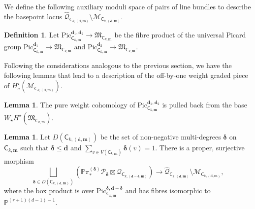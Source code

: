 \documentclass[12pt,reqno]{amsart}
\theoremstyle{definition}
\theoremstyle{definition}
\theoremstyle{definition}
\theoremstyle{definition}
\newtheorem{lemma}[theorem]{Lemma}
\newtheorem{definition}[theorem]{Definition}
\begin{document}
We define the following auxiliary moduli space of pairs of line bundles to describe the basepoint locus $\hat{\mathcal{Q}}_{\mathsf{C}_{k, (\mathbf{d}, \mathbf{m})}}\setminus \mathcal{M}_{\mathsf{C}_{k, (\mathbf{d}, \mathbf{m})}}.$

\begin{definition}
  Let $\mathrm{Pic}^{\mathbf{d}_1, \mathbf{d}_2}_{\mathsf{C}_{k, \mathbf{m}}}\to \mathfrak{M}_{\mathsf{C}_{k, \mathbf{m}}}$ be the fibre product of the universal Picard group $\mathrm{Pic}^{\mathbf{d}_1}_{\mathsf{C}_{k, \mathbf{m}}}\to \mathfrak{M}_{\mathsf{C}_{k, \mathbf{m}}}$ and $\mathrm{Pic}^{\mathbf{d}_2}_{\mathsf{C}_{k, \mathbf{m}}}\to \mathfrak{M}_{\mathsf{C}_{k, \mathbf{m}}}$.
\end{definition}

Following the considerations analogous to the previous section, we have the following lemmas that lead to a description of the off-by-one weight graded piece of $H_c^\star(\mathcal{M}_{\mathsf{C}_{k, (\mathbf{d}, \mathbf{m})}}).$

\begin{lemma}
  The pure weight cohomology of $\mathrm{Pic}^{\mathbf{d}_1, \mathbf{d}_2}_{\mathsf{C}_{k, \mathbf{m}}}$ is pulled back from the base $W_\star H^\star(\mathfrak{M}_{\mathsf{C}_{k, \mathbf{m}}}).$\end{lemma}

\begin{lemma}\label{lem:mckdm}
  Let $D(\mathsf{C}_{k, (\mathbf{d}, \mathbf{m})})$ be the set of non-negative multi-degrees $\boldsymbol{\delta}$ on $\mathsf{C}_{k, \mathbf{m}}$ such that $\boldsymbol{\delta}\leq \mathbf{d}$ and $\sum_{v\in V(\mathsf{C}_{k, \mathbf{m}})}\boldsymbol{\delta}(v)=1.$ There is a proper, surjective morphism $$\bigsqcup_{\boldsymbol{\delta}\in D(\mathsf{C}_{k, (\mathbf{d}, \mathbf{m})})} \left(\mathbb{P}\pi^{(\boldsymbol{\delta})}_* \mathcal{P}_{\boldsymbol{\delta}}\boxtimes \hat{\mathcal{Q}}_{\mathsf{C}_{k, (\mathbf{d}-\boldsymbol{\delta}, \mathbf{m})}}\right)\to \hat{\mathcal{Q}}_{\mathsf{C}_{k, (\mathbf{d}, \mathbf{m})}}\setminus \mathcal{M}_{\mathsf{C}_{k, (\mathbf{d}, \mathbf{m})}},$$ where the box product is over $\mathrm{Pic}^{\boldsymbol{\delta}, \mathbf{d}- \boldsymbol{\delta}}_{\mathsf{C}_{k, \mathbf{m}}}$ and has fibres isomorphic to $\mathbb{P}^{(r+1)(d-1)-1}.$
\end{lemma}
\end{document}
